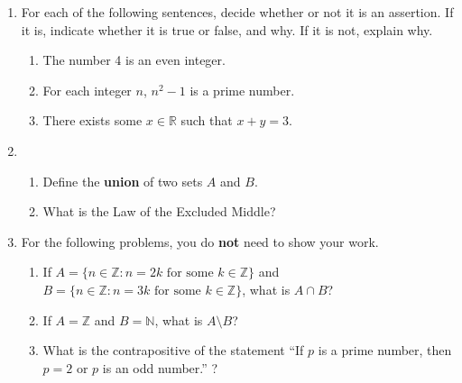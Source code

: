 \documentclass[12pt]{article}
\newcommand{\points}[1]{\marginpar{\hspace{24pt}[#1]}}
\newcommand{\R}{\mathbb{R}}
\newcommand{\N}{\mathbb{N}}
\newcommand{\Z}{\mathbb{Z}}
\begin{document}
\begin{enumerate}
\item For each of the following sentences, decide whether or not it is an assertion. If it is, indicate whether it is true or false, and why. If it is not, explain why.
\begin{enumerate}
\item The number 4 is an even integer. \points{2}

\vspace{1.25in}

\item For each integer $n$, $n^2-1$ is a prime number.\points{2}

\vspace{1.25in}

\item There exists some $x\in\R$ such that $x+y=3$. \points{2}

\vspace{1in}
\end{enumerate}

\item 
\begin{enumerate}
\item Define the {\bf union} of two sets $A$ and $B$.\points{2}

\vspace{1.25in}

\item What is the Law of the Excluded Middle?\points{2}
\end{enumerate}
\newpage

\item For the following problems, you do {\bf not} need to show your work.
\begin{enumerate}
\item If $A = \{n\in\Z : n=2k \text{ for some } k\in\Z\}$ and $B = \{n\in\Z : n=3k \text{ for some } k\in\Z\}$, what is $A\cap B$? \points{2}

\vspace{1.25in}

\item If $A= \Z$ and $B=\N$, what is $A\setminus B$?\points{2}

\vspace{1.25in}

\item What is the contrapositive of the statement ``If $p$ is a prime number, then $p=2$ or $p$ is an odd number.'' ?\points{2}

\vspace{1in}


\end{enumerate}
\end{enumerate}
\end{document}
